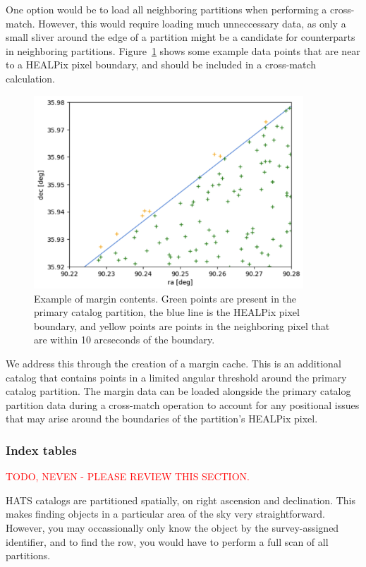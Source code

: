 \documentclass[11pt,a4paper]{ivoa}
\begin{document}
One option would be to load all neighboring partitions when performing a cross-match. 
However, this would require loading much unneccessary data, as only a small sliver around the edge of a partition might be a candidate for counterparts in neighboring partitions. 
Figure~\ref{fig:margin} shows some example data points that are near to a HEALPix pixel boundary, and should be included in a cross-match calculation.

\begin{figure}
\centering
\includegraphics[width=0.9\textwidth]{margin-pix.png}
\caption{Example of margin contents. Green points are present in the primary catalog partition, the blue line is the HEALPix pixel boundary, and yellow points are points in the neighboring pixel that are within 10 arcseconds of the boundary.}
\label{fig:margin}
\end{figure}

We address this through the creation of a margin cache.
This is an additional catalog that contains points in a limited angular threshold around the primary catalog partition.
The margin data can be loaded alongside the primary catalog partition data during a cross-match operation to account for any positional issues that may arise around the boundaries of the partition's HEALPix pixel.

\subsubsection{Index tables} \label{sec:index}

\textcolor{red}{TODO, NEVEN - PLEASE REVIEW THIS SECTION.}

HATS catalogs are partitioned spatially, on right ascension and declination. 
This makes finding objects in a particular area of the sky very straightforward. 
However, you may occassionally only know the object by the survey-assigned identifier, and to find the row, you would have to perform a full scan of all partitions. \par
\end{document}
